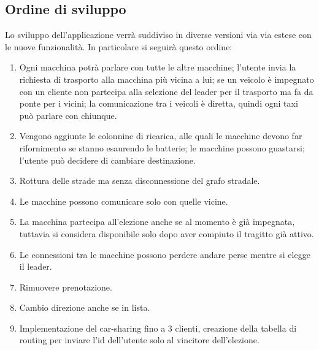\subsection{Ordine di sviluppo}
Lo sviluppo dell'applicazione verrà suddiviso in diverse versioni via via estese con le nuove funzionalità. In particolare si seguirà questo ordine:

\begin{enumerate}
	\item Ogni macchina potrà parlare con tutte le altre macchine; l'utente invia la richiesta di trasporto alla macchina più vicina a lui; se un veicolo è impegnato con un cliente non partecipa alla selezione del leader per il trasporto ma fa da ponte per i vicini; la comunicazione tra i veicoli è diretta, quindi ogni taxi può parlare con chiunque.
	\item Vengono aggiunte le colonnine di ricarica, alle quali le macchine devono far rifornimento se stanno esaurendo le batterie; le macchine possono guastarsi; l'utente può decidere di cambiare destinazione.
	\item Rottura delle strade ma senza disconnessione del grafo stradale.
	\item Le macchine possono comunicare solo con quelle vicine.
	\item La macchina partecipa all'elezione anche se al momento è già impegnata, tuttavia si considera disponibile solo dopo aver compiuto il tragitto già attivo.
	\item Le connessioni tra le macchine possono perdere andare perse mentre si elegge il leader.
	\item Rimuovere prenotazione.
	\item Cambio direzione anche se in lista.
	\item Implementazione del car-sharing fino a 3 clienti, creazione della tabella di routing per inviare l'id dell'utente solo al vincitore dell'elezione.
\end{enumerate}